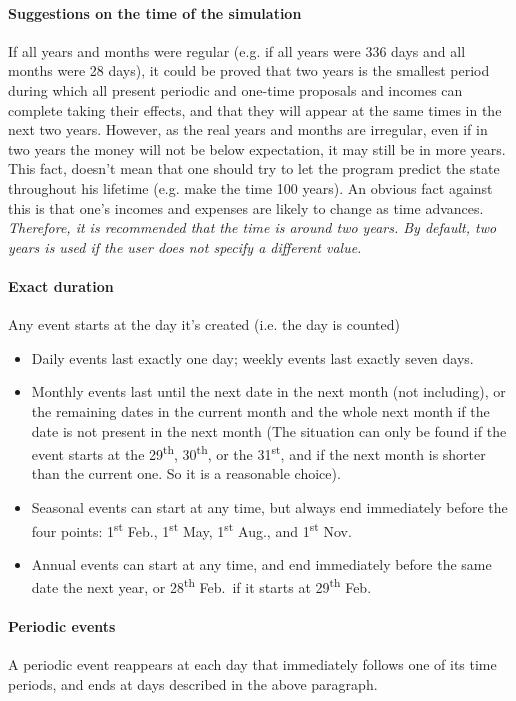 \paragraph{Suggestions on the time of the simulation} If all years and months were regular (e.g. if all years were 336 days and all months were 28 days), it could be proved that two years is the smallest period during which all present periodic and one-time proposals and incomes can complete taking their effects, and that they will appear at the same times in the next two years. However, as the real years and months are irregular, even if in two years the money will not be below expectation, it may still be in more years. This fact, doesn't mean that one should try to let the program predict the state throughout his lifetime (e.g. make the time 100 years). An obvious fact against this is that one's incomes and expenses are likely to change as time advances. \emph{Therefore, it is recommended that the time is around two years. By default, two years is used if the user does not specify a different value.}

\paragraph{Exact duration}
Any event starts at the day it's created (i.e. the day is counted)
\begin{itemize}
	\item Daily events last exactly one day; weekly events last exactly seven days.
	\item Monthly events last until the next date in the next month (not including), or the remaining dates in the current month and the whole next month if the date is not present in the next month (The situation can only be found if the event starts at the 29\textsuperscript{th}, 30\textsuperscript{th}, or the 31\textsuperscript{st}, and if the next month is shorter than the current one. So it is a reasonable choice).
	\item Seasonal events can start at any time, but always end immediately before the four points: 1\textsuperscript{st} Feb., 1\textsuperscript{st} May, 1\textsuperscript{st} Aug., and 1\textsuperscript{st} Nov.
	\item Annual events can start at any time, and end immediately before the same date the next year, or 28\textsuperscript{th} Feb.~if it starts at 29\textsuperscript{th} Feb.
\end{itemize}

\paragraph{Periodic events}
A periodic event reappears at each day that immediately follows one of its time periods, and ends at days described in the above paragraph.

